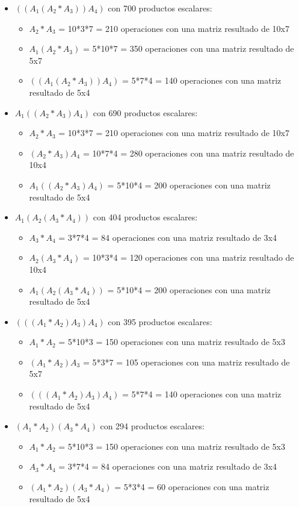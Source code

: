 \documentclass[spanish]{article}
\begin{document}
	\begin{itemize}
		\item $((A_1(A_2*A_3))A_4)$ con 700 productos escalares:
		\begin{itemize}
			\item $A_2*A_3$ = 10*3*7 = 210 operaciones con una matriz resultado de 10x7
			\item $A_1(A_2*A_3)$ = 5*10*7 = 350 operaciones con una matriz resultado de 5x7
			\item $((A_1(A_2*A_3))A_4)$ = 5*7*4 = 140 operaciones con una matriz resultado de 5x4
		\end{itemize}
		\item $A_1((A_2*A_3)A_4)$ con 690 productos escalares:
		\begin{itemize}
			\item $A_2*A_3$ = 10*3*7 = 210 operaciones con una matriz resultado de 10x7
			\item $(A_2*A_3)A_4$ = 10*7*4 = 280 operaciones con una matriz resultado de 10x4
			\item $A_1((A_2*A_3)A_4)$ = 5*10*4 = 200 operaciones con una matriz resultado de 5x4
		\end{itemize}
		\item $A_1(A_2(A_3*A_4))$ con 404 productos escalares:
		\begin{itemize}
			\item $A_3*A_4$ = 3*7*4 = 84 operaciones con una matriz resultado de 3x4
			\item $A_2(A_3*A_4)$ = 10*3*4 = 120 operaciones con una matriz resultado de 10x4
			\item $A_1(A_2(A_3*A_4))$ = 5*10*4 = 200 operaciones con una matriz resultado de 5x4
		\end{itemize}	
		\item $(((A_1*A_2)A_3)A_4)$ con 395 productos escalares:
		\begin{itemize}
			\item $A_1*A_2$ = 5*10*3 = 150 operaciones con una matriz resultado de 5x3
			\item $(A_1*A_2)A_3$ = 5*3*7 = 105 operaciones con una matriz resultado de 5x7
			\item $(((A_1*A_2)A_3)A_4)$ = 5*7*4 = 140 operaciones con una matriz resultado de 5x4
		\end{itemize}	
		\item $(A_1*A_2)(A_3*A_4)$ con 294 productos escalares:
		\begin{itemize}
			\item $A_1*A_2$ = 5*10*3 = 150 operaciones con una matriz resultado de 5x3
			\item $A_3*A_4$ = 3*7*4 = 84 operaciones con una matriz resultado de 3x4
			\item $(A_1*A_2)(A_3*A_4)$ = 5*3*4 = 60 operaciones con una matriz resultado de 5x4
		\end{itemize}
	\end{itemize}
\end{document}
